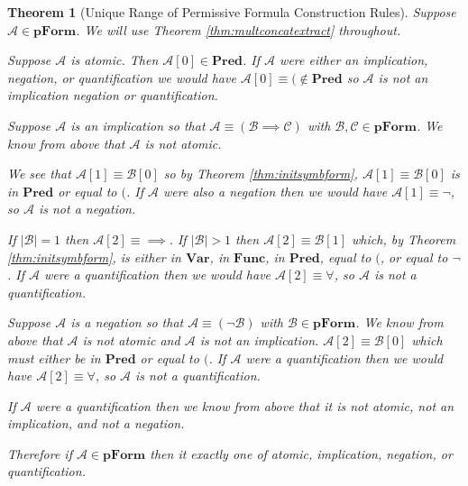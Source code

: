 \documentclass[12pt]{article}
\theoremstyle{break}
\theoremstyle{break}
\newtheorem{theorem}{Theorem}[section]
\theoremstyle{break}
\theoremstyle{break}
\newcommand{\mc}[1]{\mathcal{#1}}
\begin{document}
\begin{theorem}[Unique Range of Permissive Formula Construction Rules]
Suppose $\mc{A}\in\textbf{pForm}$.
We will use Theorem \ref{thm:multconcatextract} throughout.

Suppose $\mc{A}$ is atomic.
Then $\mc{A}[0] \in \textbf{Pred}$.
If $\mc{A}$ were either an implication, negation, or quantification we would have $\mc{A}[0]\equiv (\not\in \textbf{Pred}$ so $\mc{A}$ is not an implication negation or quantification.



Suppose $\mc{A}$ is an implication so that $\mc{A} \equiv (\mc{B}\implies \mc{C})$ with $\mc{B},\mc{C}\in\textbf{pForm}$.
We know from above that $\mc{A}$ is not atomic.

We see that $\mc{A}[1]\equiv \mc{B}[0]$ so by Theorem \ref{thm:initsymbform}, $\mc{A}[1]\equiv\mc{B}[0]$ is in $\textbf{Pred}$ or equal to $($. 
If $\mc{A}$ were also a negation then we would have $\mc{A}[1]\equiv \lnot$, so $\mc{A}$ is not a negation.

If $|\mc{B}| = 1$ then $\mc{A}[2]\equiv \implies$.
If $|\mc{B}| > 1$ then $\mc{A}[2] \equiv \mc{B}[1]$ which, by Theorem \ref{thm:initsymbform}, is either in $\textbf{Var}$, in $\textbf{Func}$, in $\textbf{Pred}$, equal to $($, or equal to $\lnot$. 
If $\mc{A}$ were a quantification then we would have $\mc{A}[2] \equiv \forall$, so $\mc{A}$ is not a quantification.

Suppose $\mc{A}$ is a negation so that $\mc{A} \equiv (\lnot \mc{B})$ with $\mc{B}\in\textbf{pForm}$.
We know from above that $\mc{A}$ is not atomic and $\mc{A}$ is not an implication.
$\mc{A}[2] \equiv \mc{B}[0]$ which must either be in $\textbf{Pred}$ or equal to $($.
If $\mc{A}$ were a quantification then we would have $\mc{A}[2] \equiv \forall$, so $\mc{A}$ is not a quantification.

If $\mc{A}$ were a quantification then we know from above that it is not atomic, not an implication, and not a negation.

Therefore if $\mc{A}\in\textbf{pForm}$ then it exactly one of atomic, implication, negation, or quantification.
\end{theorem}
\end{document}
